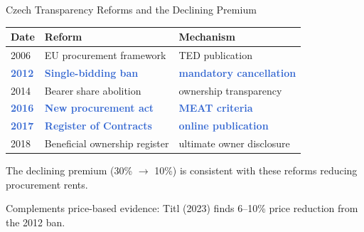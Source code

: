 \documentclass[aspectratio=169,11pt]{beamer}
\newcommand{\highlighttext}[1]{\textcolor{highlight}{\textbf{#1}}}
\begin{document}
\begin{frame}{Czech Transparency Reforms and the Declining Premium}

\begin{center}
\begin{tabular}{lll}
\toprule
Date & Reform & Mechanism \\
\midrule
2006 & EU procurement framework & TED publication \\
\highlighttext{2012} & \highlighttext{Single-bidding ban} & \highlighttext{mandatory cancellation} \\
2014 & Bearer share abolition & ownership transparency \\
\highlighttext{2016} & \highlighttext{New procurement act} & \highlighttext{MEAT criteria} \\
\highlighttext{2017} & \highlighttext{Register of Contracts} & \highlighttext{online publication} \\
2018 & Beneficial ownership register & ultimate owner disclosure \\
\bottomrule
\end{tabular}
\end{center}

\bigskip

The declining premium (30\% $\to$ 10\%) is consistent with these reforms reducing procurement rents.

\medskip

Complements price-based evidence: Titl (2023) finds 6--10\% price reduction from the 2012 ban.

\end{frame}
\end{document}
